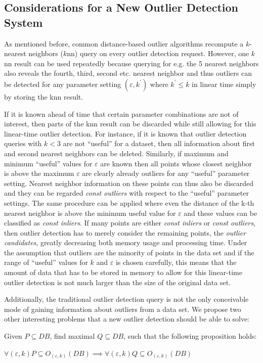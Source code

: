 \documentclass[runningheads]{llncs}
\begin{document}
\subsection{Considerations for a New Outlier Detection System}
As mentioned before, common distance-based outlier algorithms recompute a $k$-nearest neighbors ($k$nn) query on every outlier detection request. However, one $k$nn result can be used repeatedly because querying for e.g. the 5 nearest neighbors also reveals the fourth, third, second etc. nearest neighbor and thus outliers can be detected for any parameter setting $(\varepsilon,k^\prime)$ where $k^\prime \leq k$ in linear time simply by storing the knn result.

If it is known ahead of time that certain parameter combinations are not of interest, then parts of the knn result can be discarded while still allowing for this linear-time outlier detection. For instance, if it is known that outlier detection queries with $k < 3$ are not ``useful'' for a dataset, then all information about first and second nearest neighbors can be deleted. Similarly, if maximum and minimum ``useful'' values for $\varepsilon$ are known then all points whose closest neighbor is above the maximum $\varepsilon$ are clearly already outliers for any ``useful'' parameter setting. Nearest neighbor information on these points can thus also be discarded and they can be regarded \emph{const outliers} with respect to the ``useful'' parameter settings. The same procedure can be applied where even the distance of the k-th nearest neighbor is above the minimum useful value for $\varepsilon$ and these values can be classified as \emph{const inliers}. If many points are either \emph{const inliers} or \emph{const outliers}, then outlier detection has to merely consider the remaining points, the \emph{outlier candidates}, greatly decreasing both memory usage and processing time. Under the assumption that outliers are the minority of points in the data set and if the range of ``useful'' values for $k$ and $\varepsilon$ is chosen carefully, this means that the amount of data that has to be stored in memory to allow for this linear-time outlier detection is not much larger than the size of the original data set.

Additionally, the traditional outlier detection query is not the only conceivable mode of gaining information about outliers from a data set. We propose two other interesting problems that a new outlier detection should be able to solve:

\begin{definition}

\noindent Given $P\subseteq DB$, find maximal $Q\subseteq DB$, such that the following proposition holds:

\noindent $\forall (\varepsilon,k) P \subseteq O_{(\varepsilon, k)}(DB) \implies \forall (\varepsilon,k)Q\subseteq O_{(\varepsilon, k)}(DB)$
\end{definition}
\end{document}
